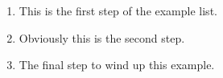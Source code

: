 	 \begin{enumerate}[Step 1.]
	  \item This is the first step of the example list.
	  \item Obviously this is the second step.
	  \item The final step to wind up this example.
	 \end{enumerate}
	
